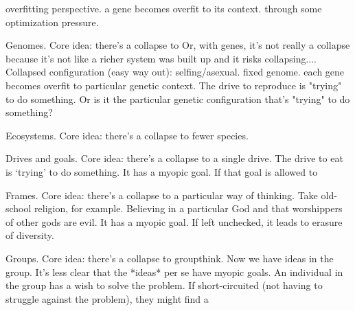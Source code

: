 \documentclass[11pt]{article}
\begin{document}
overfitting perspective. a gene becomes overfit to its context. through some optimization pressure. 

Genomes.
Core idea: there's a collapse to 
Or, with genes, it's not really a collapse because it's not like a richer system was built up and it risks collapsing....
Collapsed configuration (easy way out): selfing/asexual. fixed genome. each gene becomes overfit to particular genetic context. 
The drive to reproduce is "trying" to do something.
Or is it the particular genetic configuration that's "trying" to do something?

Ecosystems.
Core idea: there's a collapse to fewer species.

Drives and goals.
Core idea: there's a collapse to a single drive. 
The drive to eat is `trying' to do something. It has a myopic goal. If that goal is allowed to 

Frames.
Core idea: there's a collapse to a particular way of thinking.
Take old-school religion, for example. Believing in a particular God and that worshippers of other gods are evil. It has a myopic goal. If left unchecked, it leads to erasure of diversity. 

Groups. 
Core idea: there's a collapse to groupthink.
Now we have ideas in the group. It's less clear that the *ideas* per se have myopic goals. An individual in the group has a wish to solve the problem. If short-circuited (not having to struggle against the problem), they might find a 

\end{document}
